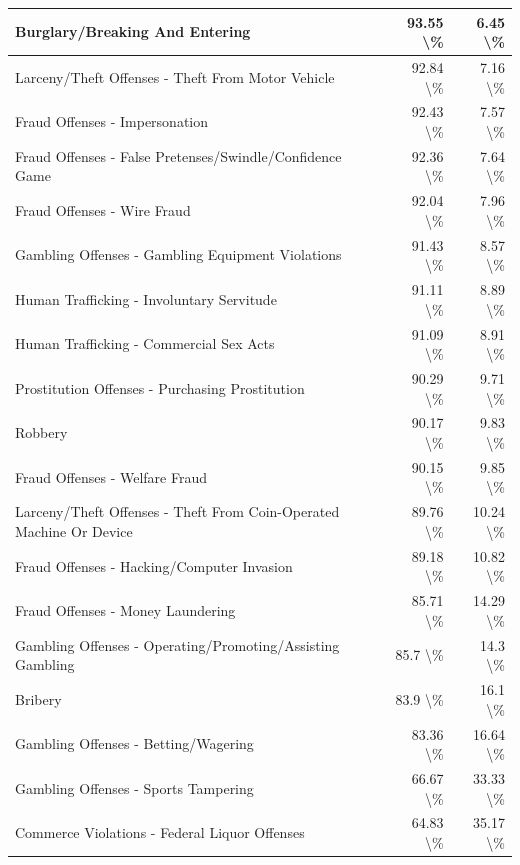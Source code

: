 \documentclass[
]{krantz}
\begin{document}
\begin{longtable}[t]{l|r|r}
\hline
Burglary/Breaking And Entering & 93.55 \textbackslash{}\% & 6.45 \textbackslash{}\%\\
\hline
Larceny/Theft Offenses - Theft From Motor Vehicle & 92.84 \textbackslash{}\% & 7.16 \textbackslash{}\%\\
\hline
Fraud Offenses - Impersonation & 92.43 \textbackslash{}\% & 7.57 \textbackslash{}\%\\
\hline
Fraud Offenses - False Pretenses/Swindle/Confidence Game & 92.36 \textbackslash{}\% & 7.64 \textbackslash{}\%\\
\hline
Fraud Offenses - Wire Fraud & 92.04 \textbackslash{}\% & 7.96 \textbackslash{}\%\\
\hline
Gambling Offenses - Gambling Equipment Violations & 91.43 \textbackslash{}\% & 8.57 \textbackslash{}\%\\
\hline
Human Trafficking - Involuntary Servitude & 91.11 \textbackslash{}\% & 8.89 \textbackslash{}\%\\
\hline
Human Trafficking - Commercial Sex Acts & 91.09 \textbackslash{}\% & 8.91 \textbackslash{}\%\\
\hline
Prostitution Offenses - Purchasing Prostitution & 90.29 \textbackslash{}\% & 9.71 \textbackslash{}\%\\
\hline
Robbery & 90.17 \textbackslash{}\% & 9.83 \textbackslash{}\%\\
\hline
Fraud Offenses - Welfare Fraud & 90.15 \textbackslash{}\% & 9.85 \textbackslash{}\%\\
\hline
Larceny/Theft Offenses - Theft From Coin-Operated Machine Or Device & 89.76 \textbackslash{}\% & 10.24 \textbackslash{}\%\\
\hline
Fraud Offenses - Hacking/Computer Invasion & 89.18 \textbackslash{}\% & 10.82 \textbackslash{}\%\\
\hline
Fraud Offenses - Money Laundering & 85.71 \textbackslash{}\% & 14.29 \textbackslash{}\%\\
\hline
Gambling Offenses - Operating/Promoting/Assisting Gambling & 85.7 \textbackslash{}\% & 14.3 \textbackslash{}\%\\
\hline
Bribery & 83.9 \textbackslash{}\% & 16.1 \textbackslash{}\%\\
\hline
Gambling Offenses - Betting/Wagering & 83.36 \textbackslash{}\% & 16.64 \textbackslash{}\%\\
\hline
Gambling Offenses - Sports Tampering & 66.67 \textbackslash{}\% & 33.33 \textbackslash{}\%\\
\hline
Commerce Violations - Federal Liquor Offenses & 64.83 \textbackslash{}\% & 35.17 \textbackslash{}\%\\

\end{longtable}
\end{document}
